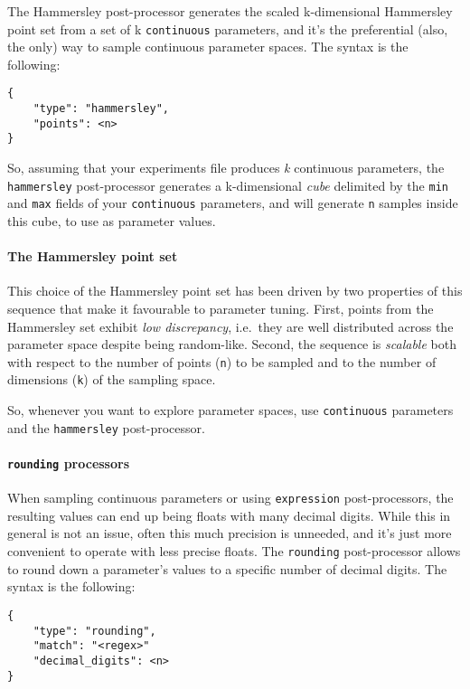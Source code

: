 \documentclass[11pt,notitlepage,twoside,a4paper]{article}
\begin{document}
\begin{footnotesize}
The Hammersley post-processor generates the scaled k-dimensional
Hammersley point set from a set of k \texttt{continuous} parameters, and
it's the preferential (also, the only) way to sample continuous
parameter spaces. The syntax is the following:

\begin{lstlisting}
{
    "type": "hammersley",
    "points": <n>
}
\end{lstlisting}

So, assuming that your experiments file produces \emph{k} continuous
parameters, the \texttt{hammersley} post-processor generates a
k-dimensional \emph{cube} delimited by the \texttt{min} and \texttt{max}
fields of your \texttt{continuous} parameters, and will generate
\texttt{n} samples inside this cube, to use as parameter values.

\paragraph{The Hammersley point set} This choice of the Hammersley point set has been driven by two
properties of this sequence that make it favourable to parameter tuning.
First, points from the Hammersley set exhibit \emph{low discrepancy},
i.e.~they are well distributed across the parameter space despite being
random-like. Second, the sequence is \emph{scalable} both with respect
to the number of points (\texttt{n}) to be sampled and to the number of
dimensions (\texttt{k}) of the sampling space.

So, whenever you want to explore parameter spaces, use
\texttt{continuous} parameters and the \texttt{hammersley}
post-processor.

\paragraph{\texttt{rounding} processors}

When sampling continuous parameters or using \texttt{expression}
post-processors, the resulting values can end up being floats with many
decimal digits. While this in general is not an issue, often this much
precision is unneeded, and it's just more convenient to operate with
less precise floats. The \texttt{rounding} post-processor allows to
round down a parameter's values to a specific number of decimal digits.
The syntax is the following:

\begin{lstlisting}
{
    "type": "rounding",
    "match": "<regex>"
    "decimal_digits": <n>
}
\end{lstlisting}


\end{footnotesize}
\end{document}
